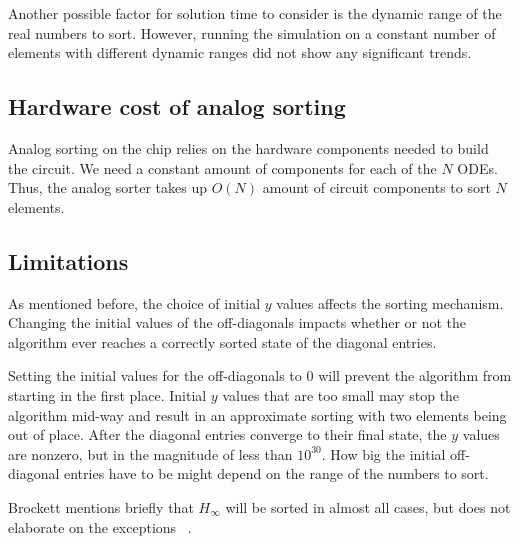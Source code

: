 Another possible factor for solution time to consider is the dynamic range of the real numbers to sort. However, running the simulation on a constant number of elements with different dynamic ranges did not show any significant trends.

\subsection{Hardware cost of analog sorting}

Analog sorting on the chip relies on the hardware components needed to build the circuit. 
We need a constant amount of components for each of the $N$ ODEs.
Thus, the analog sorter takes up $O(N)$ amount of circuit components to sort $N$ elements.

\subsection{Limitations}

As mentioned before, the choice of initial $y$ values affects the sorting mechanism. Changing the initial values of the off-diagonals impacts whether or not the algorithm ever reaches a correctly sorted state of the diagonal entries.

Setting the initial values for the off-diagonals to $0$ will prevent the algorithm from starting in the first place. Initial $y$ values that are too small may stop the algorithm mid-way and result in an approximate sorting with two elements being out of place. After the diagonal entries converge to their final state, the $y$ values are nonzero, but in the magnitude of less than $10^{30}$. How big the initial off-diagonal entries have to be might depend on the range of the numbers to sort.

Brockett mentions briefly that $H_\infty$ will be sorted in almost all cases, but does not elaborate on the exceptions ~\cite{brockett}.




